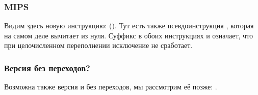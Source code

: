 

\subsubsection{MIPS}



Видим здесь новую инструкцию:  ().
Тут есть также псевдоинструкция , которая на самом деле вычитает из нуля.
Суффикс  в обоих инструкциях  и  означает, что при целочисленном переполнении исключение не
сработает.

\subsubsection{Версия без переходов?}

Возможна также версия и без переходов, мы рассмотрим её позже: .
